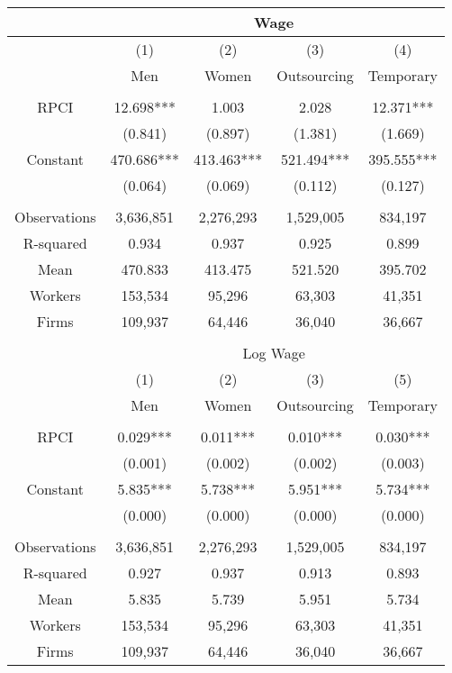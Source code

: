 \begin{tabular}{c|cccc}
\toprule
\toprule
      & \multicolumn{4}{c}{Wage} \\
\midrule
      & (1)   & (2)   & (3)   & (4) \\
      & Men   & Women & Outsourcing & Temporary \\
\midrule
      &       &       &       &  \\
RPCI  & 12.698*** & 1.003 & 2.028 & 12.371*** \\
      & (0.841) & (0.897) & (1.381) & (1.669) \\
Constant & 470.686*** & 413.463*** & 521.494*** & 395.555*** \\
      & (0.064) & (0.069) & (0.112) & (0.127) \\
      &       &       &       &  \\
\midrule
Observations & 3,636,851 & 2,276,293 & 1,529,005 & 834,197 \\
R-squared & 0.934 & 0.937 & 0.925 & 0.899 \\
Mean  & 470.833 & 413.475 & 521.520 & 395.702 \\
Workers & 153,534 & 95,296 & 63,303 & 41,351 \\
Firms & 109,937 & 64,446 & 36,040 & 36,667 \\
\midrule
\midrule
\multicolumn{1}{r}{} &       &       &       &  \\
\midrule
\midrule
      & \multicolumn{4}{c}{Log Wage} \\
\midrule
      & (1)   & (2)   & (3)   & (5) \\
      & Men   & Women & Outsourcing & Temporary \\
\midrule
      &       &       &       &  \\
RPCI  & 0.029*** & 0.011*** & 0.010*** & 0.030*** \\
      & (0.001) & (0.002) & (0.002) & (0.003) \\
Constant & 5.835*** & 5.738*** & 5.951*** & 5.734*** \\
      & (0.000) & (0.000) & (0.000) & (0.000) \\
      &       &       &       &  \\
\midrule
Observations & 3,636,851 & 2,276,293 & 1,529,005 & 834,197 \\
R-squared & 0.927 & 0.937 & 0.913 & 0.893 \\
Mean  & 5.835 & 5.739 & 5.951 & 5.734 \\
Workers & 153,534 & 95,296 & 63,303 & 41,351 \\
Firms & 109,937 & 64,446 & 36,040 & 36,667 \\
\bottomrule
\bottomrule
\end{tabular}%

